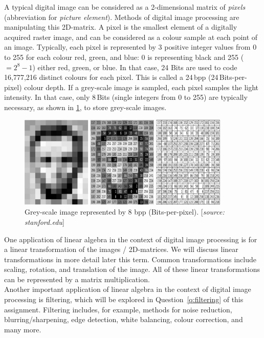 \documentclass[10pt,addpoints]{exam} %
\begin{document}
A typical digital image can be considered as a 2-dimensional matrix of \textit{pixels} (abbreviation
for \textit{picture element}). Methods of digital image processing are manipulating this
2D-matrix. A pixel is the smallest element of a digitally acquired raster image, and can be
considered as a colour sample at each point of an image. Typically, each pixel is represented by 3
positive integer values from 0 to 255 for each colour red, green, and blue: 0 is representing black
and 255 ($= 2^8-1$) either red, green, or blue. In that case, 24 Bits are used to code 16,777,216
distinct colours for each pixel. This is called a 24\,bpp (24\,Bits-per-pixel) colour depth. If a
grey-scale image is sampled, each pixel samples the light intensity. In that case, only 8\,Bits
(single integers from 0 to 255) are typically necessary, as shown in \cref{fig:imagematrix}, to
store grey-scale images.

\begin{figure}[H]
  \centering
  \includegraphics[width=0.9\textwidth]{imagematrix.pdf}
  \caption{Grey-scale image represented by 8 bpp
    (Bits-per-pixel). [\textit{source: stanford.edu}]}
  \label{fig:imagematrix}
\end{figure}

One application of linear algebra in the context of digital image processing is for a linear
transformation of the images / 2D-matrices. We will discuss linear transformations in more detail
later this term. Common transformations include scaling, rotation, and translation of the image. All
of these linear transformations can be represented by a matrix
multiplication.\\

Another important application of linear algebra in the context of digital image processing is
filtering, which will be explored in Question~\ref{q:filtering} of this assignment. Filtering
includes, for example, methods for noise reduction, blurring/sharpening, edge
detection, white balancing, colour correction, and many more.\\
\end{document}
